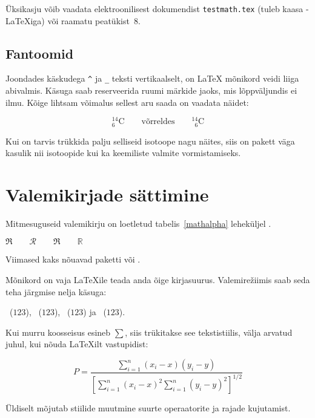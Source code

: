 Üksikasju võib vaadata elektroonilisest dokumendist
\texttt{testmath.tex} (tuleb kaasa \AmS-\LaTeX iga) või raamatu
\companion{} peatükist~8.

\subsection{Fantoomid}

Joondades käskudega \verb|^| ja
\verb|_| teksti vertikaalselt, on \LaTeX{} mõnikord
veidi liiga abivalmis. Käsuga  saab reserveerida ruumi
märkide jaoks, mis lõppväljundis ei ilmu. Kõige lihtsam võimalus sellest
aru saada on vaadata näidet:
\begin{example}
\begin{equation*}
{}^{14}_{6}\text{C}
\qquad \text{võrreldes} \qquad
{}^{14}_{\phantom{1}6}\text{C}
\end{equation*}
\end{example}
Kui on tarvis trükkida palju selliseid isotoope nagu näites, siis on
pakett  väga kasulik nii isotoopide kui ka keemiliste
valmite vormistamiseks.

\section{Valemikirjade sättimine}\label{sec:fontsz}

Mitmesuguseid valemikirju on loetletud tabelis~\ref{mathalpha}
leheküljel \pageref{mathalpha}.
\begin{example}
 $\Re \qquad
  \mathcal{R} \qquad
  \mathfrak{R} \qquad
  \mathbb{R} \qquad $
\end{example}
\noindent Viimased kaks nõuavad paketti  või .

Mõnikord on vaja \LaTeX ile teada anda õige
kirjasuurus. Valemire\v{z}iimis saab seda teha
järgmise nelja käsuga:
\begin{flushleft}
~($\displaystyle 123$),
~($\textstyle 123$),
~($\scriptstyle 123$) ja
~($\scriptscriptstyle 123$).
\end{flushleft}

Kui murru koosseisus esineb $\sum$, siis trükitakse see tekstistiilis,
välja arvatud juhul, kui nõuda \LaTeX ilt vastupidist:
\begin{example}
\begin{equation*}
 P = \frac{\displaystyle {
   \sum_{i=1}^n (x_i-x)
   (y_i-y)}}
   {\displaystyle{\left[
   \sum_{i=1}^n(x_i-x)^2
   \sum_{i=1}^n(y_i-y)^2
   \right]^{1/2}}}
\end{equation*}
\end{example}
\noindent Üldiselt mõjutab stiilide muutmine suurte operaatorite ja
rajade kujutamist.

